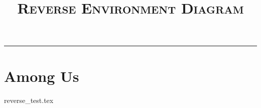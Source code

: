 \documentclass{exam}
\title{\textsc{Reverse Environment Diagram}}
\begin{document}
\maketitle
\rule{\textwidth}{0.15em}
\fontsize{12}{15}\selectfont

\section{Among Us}
\begin{questions}
{reverse_test.tex}
\end{questions}
\end{document}
